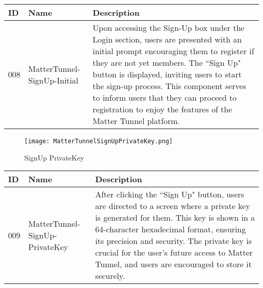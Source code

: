 \documentclass[conference]{IEEEtran}
\begin{document}
\begin{enumerate}[itemsep=2ex, parsep=1ex]
\begin{enumerate}[itemsep=2ex, parsep=1ex]
	      	      \begin{table}[h!]
	      	      	\def\arraystretch{1.24} \small
	      	      	\begin{tabular}{|p{1.2cm}|p{2.5cm}|p{4.0cm}|}
	      	      		\hline
	      	      		ID  & Name                        & Description                                                                                                                                                                                                                                                                                                                                                                    \\
	      	      		\hline
	      	      		008 & MatterTunnel-SignUp-Initial & Upon accessing the Sign-Up box under the Login section, users are presented with an initial prompt encouraging them to register if they are not yet members. The ``Sign Up" button is displayed, inviting users to start the sign-up process. This component serves to inform users that they can proceed to registration to enjoy the features of the Matter Tunnel platform. \\
	      	      		\hline
	      	      	\end{tabular}
	      	      \end{table}
	      	      
	      	      \begin{figure}[h!]
	      	      	\centering
	      	      	\texttt{[image: MatterTunnelSignUpPrivateKey.png]}
	      	      	\caption{SignUp PrivateKey}
	      	      	\label{fig:MatterTunnelSignUpPrivateKey}
	      	      \end{figure}
	      	                        
	      	      \begin{table}[h!]
	      	      	\def\arraystretch{1.24} \small
	      	      	\begin{tabular}{|p{1.2cm}|p{2.5cm}|p{4.0cm}|}
	      	      		\hline
	      	      		ID  & Name                           & Description                                                                                                                                                                                                                                                                                                                           \\
	      	      		\hline
	      	      		009 & MatterTunnel-SignUp-PrivateKey & After clicking the ``Sign Up" button, users are directed to a screen where a private key is generated for them. This key is shown in a 64-character hexadecimal format, ensuring its precision and security. The private key is crucial for the user's future access to Matter Tunnel, and users are encouraged to store it securely. \\
	      	      		\hline
	      	      	\end{tabular}
	      	      \end{table}
	      	      

\end{enumerate}
\end{enumerate}
\end{document}
